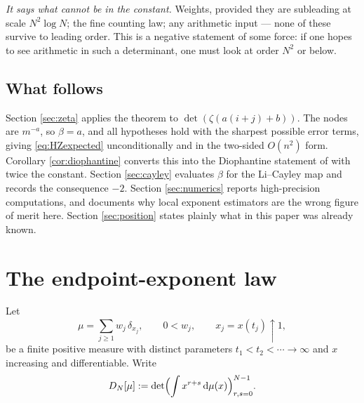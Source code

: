 \documentclass[11pt]{amsart}
\numberwithin{equation}{section}
\theoremstyle{plain}
\theoremstyle{definition}
\theoremstyle{remark}
\newcommand{\dd}{\,\mathrm d}
\begin{document}
\emph{It says what cannot be in the constant.} Weights, provided they are subleading at scale
$N^{2}\log N$; the fine counting law; any arithmetic input --- none of these survive to leading order.
This is a negative statement of some force: if one hopes to see arithmetic in such a determinant,
one must look at order $N^{2}$ or below.

\subsection{What follows}

Section \ref{sec:zeta} applies the theorem to $\det(\zeta(a(i+j)+b))$. The nodes are $m^{-a}$, so
$\beta=a$, and all hypotheses hold with the sharpest possible error terms, giving
\eqref{eq:HZexpected} unconditionally and in the two-sided $O(n^{2})$ form. Corollary
\ref{cor:diophantine} converts this into the Diophantine statement of \cite{HaynesZudilin2015}
with twice the constant. Section \ref{sec:cayley} evaluates $\beta$ for the Li--Cayley map and
records the consequence $-2$. Section \ref{sec:numerics} reports high-precision computations, and
documents why local exponent estimators are the wrong figure of merit here. Section
\ref{sec:position} states plainly what in this paper was already known.

\section{The endpoint-exponent law}
\label{sec:law}

Let
\begin{equation}
\mu=\sum_{j\ge1}w_{j}\,\delta_{x_{j}},\qquad 0<w_{j},\qquad x_{j}=x(t_{j})\uparrow1,
\label{eq:measure}
\end{equation}
be a finite positive measure with distinct parameters $t_{1}<t_{2}<\cdots\to\infty$ and $x$
increasing and differentiable. Write
\begin{equation}
D_{N}[\mu]:=\det\Bigl(\int x^{r+s}\dd\mu(x)\Bigr)_{r,s=0}^{N-1}.
\label{eq:hankel}
\end{equation}
\end{document}
